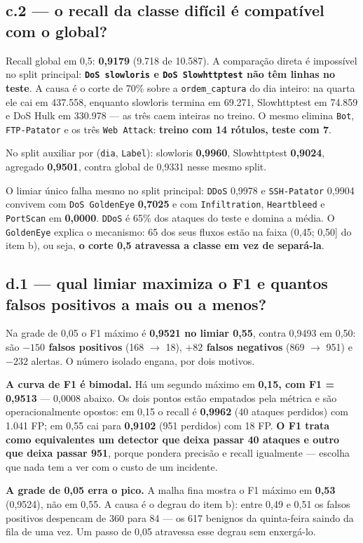 \documentclass[10pt,a4paper]{article}
\newcommand{\resp}[1]{\subsection{#1}}
\begin{document}
\resp{c.2 --- o recall da classe difícil é compatível com o global?}

Recall global em 0,5: \textbf{0,9179} (9.718 de 10.587). A comparação direta é impossível no
split principal: \textbf{\texttt{DoS slowloris} e \texttt{DoS Slowhttptest} não têm linhas no
teste}. A causa é o corte de 70\% sobre a \texttt{ordem\_captura} do dia inteiro: na quarta ele
cai em 437.558, enquanto slowloris termina em 69.271, Slowhttptest em 74.859 e DoS Hulk em
330.978 --- as três caem inteiras no treino. O mesmo elimina \texttt{Bot}, \texttt{FTP-Patator}
e os três \texttt{Web Attack}: \textbf{treino com 14 rótulos, teste com 7}.

No split auxiliar por (\texttt{dia}, \texttt{Label}): slowloris \textbf{0,9960}, Slowhttptest
\textbf{0,9024}, agregado \textbf{0,9501}, contra global de 0,9331 nesse mesmo split.

O limiar único falha mesmo no split principal: \texttt{DDoS} 0,9978 e \texttt{SSH-Patator}
0,9904 convivem com \texttt{DoS GoldenEye} \textbf{0,7025} e com \texttt{Infiltration},
\texttt{Heartbleed} e \texttt{PortScan} em \textbf{0,0000}. \texttt{DDoS} é 65\% dos ataques do
teste e domina a média. O \texttt{GoldenEye} explica o mecanismo: 65 dos seus fluxos estão na
faixa (0,45; 0,50] do item b), ou seja, \textbf{o corte 0,5 atravessa a classe em vez de
separá-la}.

\resp{d.1 --- qual limiar maximiza o F1 e quantos falsos positivos a mais ou a menos?}

Na grade de 0,05 o F1 máximo é \textbf{0,9521 no limiar 0,55}, contra 0,9493 em 0,50: são
\textbf{$-150$ falsos positivos} (168 $\to$ 18), \textbf{$+82$ falsos negativos} (869 $\to$
951) e $-232$ alertas. O número isolado engana, por dois motivos.

\textbf{A curva de F1 é bimodal.} Há um segundo máximo em \textbf{0,15, com F1 = 0,9513} ---
0,0008 abaixo. Os dois pontos estão empatados pela métrica e são operacionalmente opostos: em
0,15 o recall é \textbf{0,9962} (40 ataques perdidos) com 1.041 FP; em 0,55 cai para
\textbf{0,9102} (951 perdidos) com 18 FP. \textbf{O F1 trata como equivalentes um detector que
deixa passar 40 ataques e outro que deixa passar 951}, porque pondera precisão e recall
igualmente --- escolha que nada tem a ver com o custo de um incidente.

\textbf{A grade de 0,05 erra o pico.} A malha fina mostra o F1 máximo em \textbf{0,53}
(0,9524), não em 0,55. A causa é o degrau do item b): entre 0,49 e 0,51 os falsos positivos
despencam de 360 para 84 --- os 617 benignos da quinta-feira saindo da fila de uma vez. Um
passo de 0,05 atravessa esse degrau sem enxergá-lo.
\end{document}
